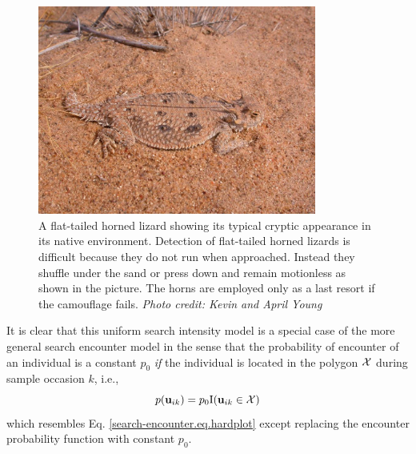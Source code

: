 \begin{figure}
\centering
\includegraphics[width=3.6in,height=2.7in]{Ch15-searchencounter/figs/horny_lizard.jpg}
\caption{A flat-tailed horned lizard showing its typical cryptic
  appearance in its native environment.  Detection of flat-tailed
  horned lizards is difficult because they do not run when
  approached. Instead they shuffle under the sand or press down and
  remain motionless as shown in the picture.  The horns are employed
  only as a last resort if the camouflage fails.  {\it Photo credit:
    Kevin and April Young} }
\label{searchencounter.fig.hornylizard}
\end{figure}

It is clear that this uniform search intensity model is a
special case of the more general search encounter model in the sense
that the probability of encounter of an individual is a constant
$p_{0}$ {\it if} the individual is located in the polygon ${\cal X}$
during sample occasion $k$,  i.e.,
\[
p({\bf u}_{ik}) = p_{0} \mbox{I}({\bf u}_{ik} \in {\cal X})
\]
which resembles Eq. \ref{search-encounter.eq.hardplot} except
replacing the encounter probability function with constant $p_{0}$.

